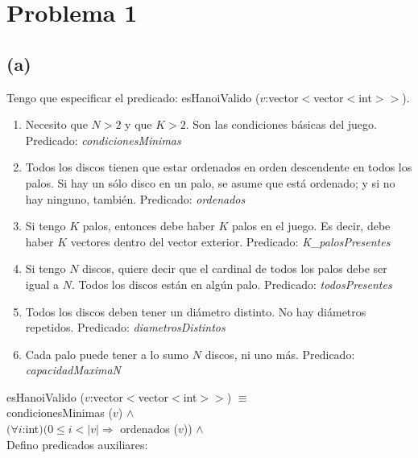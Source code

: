 \documentclass[10 pt]{article}
\begin{document}
    \section*{Problema 1}
        \subsection*{(a)}
            Tengo que especificar el predicado: esHanoiValido ($v$:vector$<$vector$<$int$>>$).
            \begin{enumerate}
                \item Necesito que $N>2$ y que $K>2$. Son las condiciones básicas del juego. Predicado:\textit{ condicionesMinimas}
                \item Todos los discos tienen que estar ordenados en orden descendente en todos los palos. Si hay un sólo disco en un palo, se asume que está ordenado; y si no hay ninguno, también. Predicado:\textit{ ordenados}
                \item Si tengo $K$ palos, entonces debe haber $K$ palos en el juego. Es decir, debe haber $K$ vectores dentro del vector exterior. Predicado:\textit{ K\_palosPresentes}
                \item Si tengo $N$ discos, quiere decir que el cardinal de todos los palos debe ser igual a $N$. Todos los discos están en algún palo. Predicado:\textit{ todosPresentes}
                \item Todos los discos deben tener un diámetro distinto. No hay diámetros repetidos. Predicado:\textit{ diametrosDistintos}
                \item Cada palo puede tener a lo sumo $N$ discos, ni uno más. Predicado:\textit{ capacidadMaximaN}
            \end{enumerate}
            esHanoiValido ($v$:vector$<$vector$<$int$>>$) $\equiv$
            \\
            condicionesMinimas ($v$) $\wedge$
            \\
            $(\forall i$:int$)(0 \leq i < |v| \Rightarrow$ ordenados ($v$)) $\wedge$
            \\
            Defino predicados auxiliares:
\end{document}
